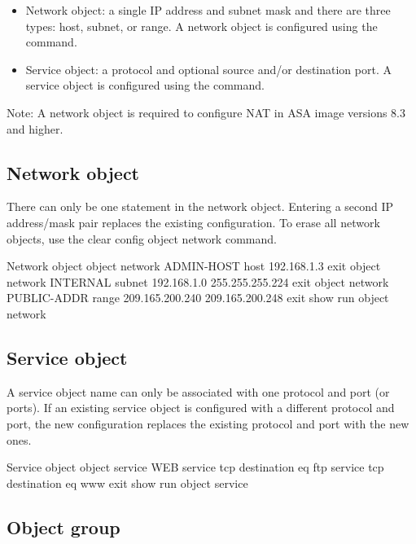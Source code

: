 \begin{itemize}
\item Network object: a single IP address and subnet mask and there are three types: host, subnet, or range. A network object is configured using the  command.
\item Service object: a protocol and optional source and/or destination port. A service object is configured using the  command.
\end{itemize}

\note Note: A network object is required to configure NAT in ASA image versions 8.3 and higher.

\subsection{Network object}

There can only be one statement in the network object. Entering a second IP address/mask pair replaces the existing configuration. To erase all network objects, use the clear config object network command. 

\begin{sexylisting}{Network object}
object network ADMIN-HOST
	host 192.168.1.3
	exit
object network INTERNAL
	subnet 192.168.1.0 255.255.255.224
	exit
object network PUBLIC-ADDR
	range 209.165.200.240 209.165.200.248
	exit
show run object	network
\end{sexylisting}

\subsection{Service object}

A service object name can only be associated with one protocol and port (or ports). If an existing service object is configured with a different protocol and port, the new configuration replaces the existing protocol and port with the new ones. 

\begin{sexylisting}{Service object}
object service WEB
	service tcp destination eq ftp
	service tcp destination eq www
	exit
show run object service	
\end{sexylisting}

\subsection{Object group}

